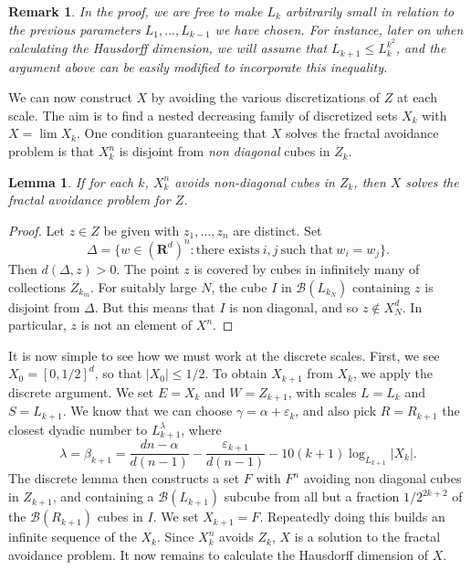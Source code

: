 \documentclass{article}
\theoremstyle{plain}
\newtheorem{lemma}{Lemma}
\theoremstyle{plain}
\newtheorem*{remark}{Remark}
\begin{document}
\begin{remark}
	In the proof, we are free to make $L_k$ arbitrarily small in relation to the previous parameters $L_1, \dots, L_{k-1}$ we have chosen. For instance, later on when calculating the Hausdorff dimension, we will assume that $L_{k+1} \leq L_k^{k^2}$, and the argument above can be easily modified to incorporate this inequality.
\end{remark}

We can now construct $X$ by avoiding the various discretizations of $Z$ at each scale. The aim is to find a nested decreasing family of discretized sets $X_k$ with $X = \lim X_k$. One condition guaranteeing that $X$ solves the fractal avoidance problem is that $X_k^n$ is disjoint from {\it non diagonal} cubes in $Z_k$.

\begin{lemma}
	If for each $k$, $X_k^n$ avoids non-diagonal cubes in $Z_k$, then $X$ solves the fractal avoidance problem for $Z$.
\end{lemma}
\begin{proof}
	Let $z \in Z$ be given with $z_1, \dots, z_n$ are distinct. Set
	\[ \Delta = \{ w \in (\mathbf{R}^d)^n : \text{there exists}\ i,j\ \text{such that}\ w_i = w_j \}. \]
	Then $d(\Delta,z) > 0$. The point $z$ is covered by cubes in infinitely many of collections $Z_{k_m}$. For suitably large $N$, the cube $I$ in $\mathcal{B}(L_{k_N})$ containing $z$ is disjoint from $\Delta$. But this means that $I$ is non diagonal, and so $z \not \in X_N^d$. In particular, $z$ is not an element of $X^n$.
\end{proof}

It is now simple to see how we must work at the discrete scales. First, we see $X_0 = [0,1/2]^d$, so that $|X_0| \leq 1/2$. To obtain $X_{k+1}$ from $X_k$, we apply the discrete argument. We set $E = X_k$ and $W = Z_{k+1}$, with scales $L = L_k$ and $S = L_{k+1}$. We know that we can choose $\gamma = \alpha + \varepsilon_k$, and also pick $R = R_{k+1}$ the closest dyadic number to $L_{k+1}^\lambda$, where
%
\[ \lambda = \beta_{k+1} = \frac{dn - \alpha}{d(n-1)} - \frac{\varepsilon_{k+1}}{d(n-1)} - 10(k+1) \log_{L_{k+1}} |X_k|. \]
%
The discrete lemma then constructs a set $F$ with $F^n$ avoiding non diagonal cubes in $Z_{k+1}$, and containing a $\mathcal{B}(L_{k+1})$ subcube from all but a fraction $1/2^{2k +2}$ of the $\mathcal{B}(R_{k+1})$ cubes in $I$. We set $X_{k+1} = F$. Repeatedly doing this builds an infinite sequence of the $X_k$. Since $X_k^n$ avoids $Z_k$, $X$ is a solution to the fractal avoidance problem. It now remains to calculate the Hausdorff dimension of $X$.
\end{document}
